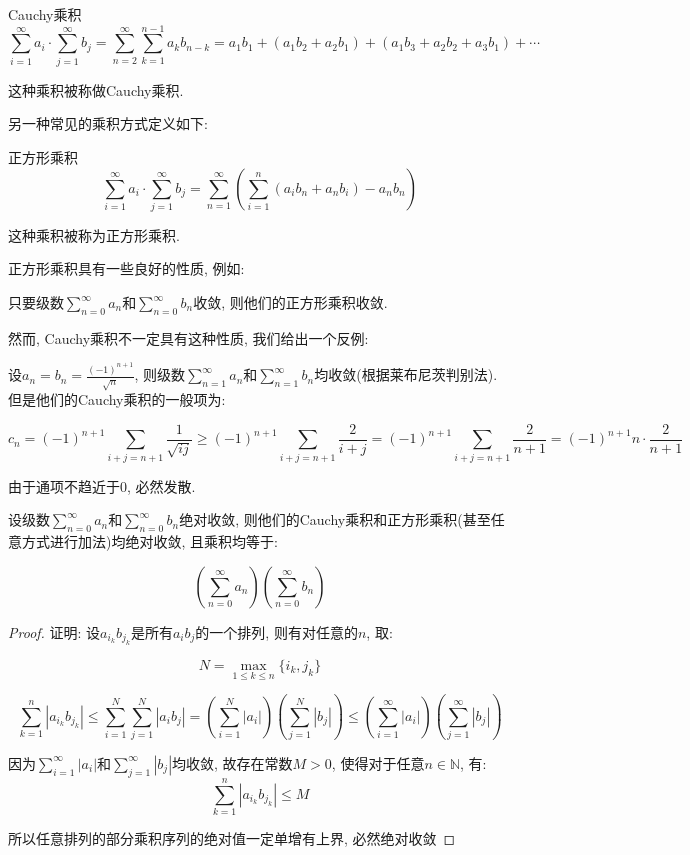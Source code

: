 \documentclass[a4paper,12pt]{ctexart}
\begin{document}
\begin{mydef}{Cauchy乘积}{}
$$
\sum_{i=1}^{\infty} a_i \cdot \sum_{j=1}^{\infty} b_j = \sum_{n=2}^{\infty} \sum_{k=1}^{n-1} a_k b_{n-k} = a_1 b_1 + (a_1 b_2 + a_2 b_1) + (a_1 b_3 + a_2 b_2 + a_3 b_1) + \cdots
$$

这种乘积被称做Cauchy乘积.
\end{mydef}

另一种常见的乘积方式定义如下:

\begin{mydef}{正方形乘积}{}
$$
\sum_{i=1}^{\infty} a_i \cdot \sum_{j=1}^{\infty} b_j = \sum_{n=1}^{\infty} \left(\sum_{i=1}^{n}(a_i b_n+ a_n b_i) - a_n b_n \right)
$$

这种乘积被称为正方形乘积.
\end{mydef}

正方形乘积具有一些良好的性质, 例如:

\begin{mythm}{}{}
只要级数$\sum_{n=0}^{\infty} a_n$和$\sum_{n=0}^{\infty} b_n$收敛, 则他们的正方形乘积收敛.
\end{mythm}

然而, Cauchy乘积不一定具有这种性质, 我们给出一个反例:

设$a_n = b_n = \frac{(-1)^{n+1}}{\sqrt{n}}$, 则级数$\sum_{n=1}^{\infty} a_n$和$\sum_{n=1}^{\infty} b_n$均收敛(根据莱布尼茨判别法). 但是他们的Cauchy乘积的一般项为:

\[
c_n = (-1)^{n+1} \sum_{i+j= n+1} \frac{1}{\sqrt{ij}} \geq (-1)^{n+1} \sum_{i+j=n+1} \frac{2}{i+j} = (-1)^{n+1} \sum_{i+j=n+1} \frac{2}{n+1} = (-1)^{n+1} n \cdot \frac{2}{n+1}
\]

由于通项不趋近于0, 必然发散.

\begin{mythm}{}{}
设级数$\sum_{n=0}^{\infty} a_n$和$\sum_{n=0}^{\infty} b_n$绝对收敛, 则他们的Cauchy乘积和正方形乘积(甚至任意方式进行加法)均绝对收敛, 且乘积均等于:

\[
\left( \sum_{n=0}^{\infty} a_n \right) \left( \sum_{n=0}^{\infty} b_n \right) 
\]
\end{mythm}

\begin{proof}
证明: 设$a_{i_k} b_{j_k}$是所有$a_i b_j$的一个排列, 则有对任意的$n$, 取:

\[
N = \max_{1 \leq k \leq n} \{i_k, j_k\}
\]

\[\sum_{k=1}^n |a_{i_k} b_{j_k}| \leq \sum_{i=1}^N \sum_{j=1}^N |a_i b_j| = \left( \sum_{i=1}^N |a_i| \right) \left( \sum_{j=1}^N |b_j| \right) \leq \left( \sum_{i=1}^{\infty} |a_i| \right) \left( \sum_{j=1}^{\infty} |b_j| \right)
\]

因为$\sum_{i=1}^{\infty} |a_i|$和$\sum_{j=1}^{\infty} |b_j|$均收敛, 故存在常数$M > 0$, 使得对于任意$n \in \mathbb{N}$, 有:
\[\sum_{k=1}^n |a_{i_k} b_{j_k}| \leq M\]

所以任意排列的部分乘积序列的绝对值一定单增有上界, 必然绝对收敛
\end{proof}
\end{document}

